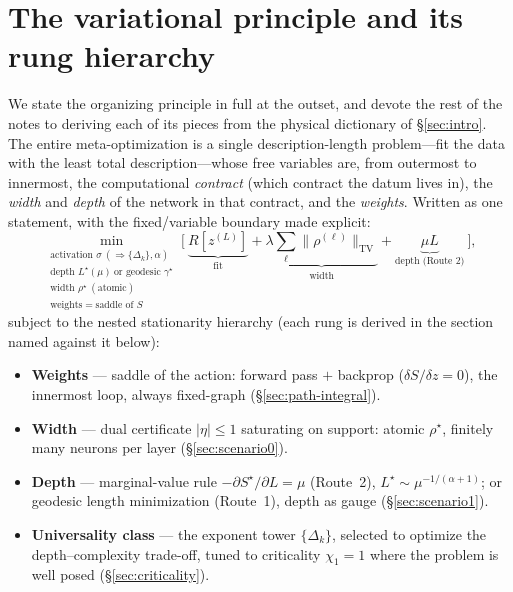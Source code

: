 \documentclass[11pt]{article}
\theoremstyle{definition}
\newcommand{\TV}{\mathrm{TV}}
\newcommand{\rhostar}{\rho^{\star}}
\newcommand{\Lstar}{L^{\star}}
\begin{document}
\section{The variational principle and its rung hierarchy}
\label{sec:consolidated}

We state the organizing principle in full at the outset, and devote the rest of the notes to deriving
each of its pieces from the physical dictionary of \S\ref{sec:intro}. The entire meta-optimization is a
single description-length problem---fit the data with the least total description---whose free variables
are, from outermost to innermost, the computational \emph{contract} (which contract the datum lives in), the
\emph{width} and \emph{depth} of the network in that contract, and the \emph{weights}. Written as one
statement, with the fixed/variable boundary made explicit:
\begin{equation}
\min_{\substack{\text{activation }\sigma\ (\Rightarrow\{\Delta_k\},\alpha)\\ \text{depth }\Lstar(\mu)\ \text{or geodesic }\gamma^\star\\ \text{width }\rhostar\ (\text{atomic})\\ \text{weights}=\text{saddle of }S}}
\Big[\ \underbrace{R[z^{(L)}]}_{\text{fit}}
+\underbrace{\lambda\textstyle\sum_\ell\|\rho^{(\ell)}\|_{\TV}}_{\text{width}}
+\underbrace{\mu L}_{\text{depth (Route 2)}}\ \Big],
\label{eq:consolidated}
\end{equation}
subject to the nested stationarity hierarchy (each rung is derived in the section named against it below):
\begin{itemize}[leftmargin=1.4em]
\item \textbf{Weights} --- saddle of the action: forward pass $+$ backprop
($\delta S/\delta z=0$), the innermost loop, always fixed-graph (\S\ref{sec:path-integral}).
\item \textbf{Width} --- dual certificate $|\eta|\le1$ saturating on support: atomic
$\rhostar$, finitely many neurons per layer (\S\ref{sec:scenario0}).
\item \textbf{Depth} --- marginal-value rule $-\partial S^\star/\partial L=\mu$ (Route~2),
$\Lstar\sim\mu^{-1/(\alpha+1)}$; or geodesic length minimization (Route~1), depth as gauge
(\S\ref{sec:scenario1}).
\item \textbf{Universality class} --- the exponent tower $\{\Delta_k\}$, selected to
optimize the depth--complexity trade-off, tuned to criticality $\chi_1=1$ where the problem
is well posed (\S\ref{sec:criticality}).
\end{itemize}
\end{document}
